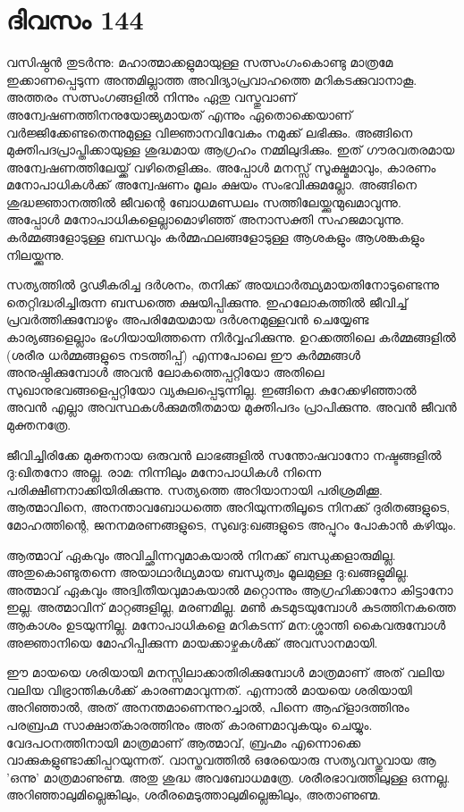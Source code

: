  
\section{ദിവസം 144}


വസിഷ്ഠൻ തുടർന്നു: മഹാത്മാക്കളുമായുള്ള സത്സംഗംകൊണ്ടു മാത്രമേ ഇക്കാണപ്പെടുന്ന അന്തമില്ലാത്ത അവിദ്യാപ്രവാഹത്തെ  മറികടക്കുവാനാകൂ. അത്തരം സത്സംഗങ്ങളിൽ നിന്നും ഏതു വസ്തുവാണ്‌ അന്വേഷണത്തിനനുയോജ്യമായത് എന്നും ഏതൊക്കെയാണ്‌ വർജ്ജിക്കേണ്ടതെന്നുമുള്ള വിജ്ഞാനവിവേകം നമുക്ക് ലഭിക്കും. അങ്ങിനെ മുക്തിപദപ്രാപ്തിക്കായുള്ള ശുദ്ധമായ ആഗ്രഹം നമ്മിലുദിക്കും. ഇത് ഗൗരവതരമായ അന്വേഷണത്തിലേയ്ക്ക് വഴിതെളിക്കും. അപ്പോൾ മനസ്സ് സൂക്ഷ്മമാവും, കാരണം മനോപാധികൾക്ക് അന്വേഷണം മൂലം ക്ഷയം സംഭവിക്കുമല്ലോ. അങ്ങിനെ ശുദ്ധജ്ഞാനത്തിൽ ജീവന്റെ ബോധമണ്ഡലം സത്തിലേയ്ക്കുന്മുഖമാവുന്നു. അപ്പോൾ മനോപാധികളെല്ലാമൊഴിഞ്ഞ് അനാസക്തി സഹജമാവുന്നു. കർമ്മങ്ങളോടുള്ള ബന്ധവും കർമ്മഫലങ്ങളോടുള്ള ആശകളും ആശങ്കകളും നിലയ്ക്കുന്നു.

സത്യത്തിൽ ദൃഢീകരിച്ച ദർശനം, തനിക്ക് അയഥാർത്ഥ്യമായതിനോടുണ്ടെന്നു തെറ്റിദ്ധരിച്ചിരുന്ന ബന്ധത്തെ ക്ഷയിപ്പിക്കുന്നു. ഇഹലോകത്തിൽ ജീവിച്ച് പ്രവർത്തിക്കുമ്പോഴും അപരിമേയമായ ദർശനമുള്ളവൻ ചെയ്യേണ്ട കാര്യങ്ങളെല്ലാം ഭംഗിയായിത്തന്നെ നിർവ്വഹിക്കുന്നു. ഉറക്കത്തിലെ കർമ്മങ്ങളിൽ (ശരീര ധർമ്മങ്ങളുടെ നടത്തിപ്പ്) എന്നപോലെ ഈ കർമ്മങ്ങൾ അനുഷ്ഠിക്കുമ്പോൾ അവൻ ലോകത്തെപ്പറ്റിയോ അതിലെ സുഖാനുഭവങ്ങളെപ്പറ്റിയോ വ്യകുലപ്പെടുന്നില്ല. ഇങ്ങിനെ കുറേക്കഴിഞ്ഞാൽ അവൻ എല്ലാ അവസ്ഥകൾക്കുമതീതമായ മുക്തിപദം പ്രാപിക്കുന്നു. അവൻ ജീവൻ മുക്തനത്രേ.

ജീവിച്ചിരിക്കേ മുക്തനായ ഒരുവൻ ലാഭങ്ങളിൽ സന്തോഷവാനോ നഷ്ടങ്ങളിൽ ദു:ഖിതനോ അല്ല. രാമ: നിന്നിലും മനോപാധികൾ നിന്നെ പരിക്ഷീണനാക്കിയിരിക്കുന്നു. സത്യത്തെ അറിയാനായി പരിശ്രമിക്കൂ. ആത്മാവിനെ, അനന്താവബോധത്തെ അറിയുന്നതിലൂടെ നിനക്ക് ദുരിതങ്ങളുടെ, മോഹത്തിന്റെ, ജനനമരണങ്ങളുടെ, സുഖദു:ഖങ്ങളുടെ അപ്പുറം പോകാൻ കഴിയും.

ആത്മാവ് ഏകവും അവിച്ഛിന്നവുമാകയാൽ നിനക്ക് ബന്ധുക്കളാരുമില്ല. അതുകൊണ്ടുതന്നെ അയാഥാർഥ്യമായ ബന്ധുത്വം മൂലമുള്ള ദു:ഖങ്ങളുമില്ല. അത്മാവ് ഏകവും അദ്വിതീയവുമാകയാൽ മറ്റൊന്നും ആഗ്രഹിക്കാനോ കിട്ടാനോ ഇല്ല. അത്മാവിന്‌ മാറ്റങ്ങളില്ല, മരണമില്ല. മൺ കുടമുടയുമ്പോൾ കുടത്തിനകത്തെ ആകാശം ഉടയുന്നില്ല. മനോപാധികളെ മറികടന്ന്‌ മന:ശ്ശാന്തി കൈവരുമ്പോൾ അജ്ഞാനിയെ മോഹിപ്പിക്കുന്ന മായക്കാഴ്ചകൾക്ക് അവസാനമായി.

ഈ മായയെ ശരിയായി മനസ്സിലാക്കാതിരിക്കുമ്പോൾ മാത്രമാണ്‌ അത് വലിയ വലിയ വിഭ്രാന്തികൾക്ക് കാരണമാവുന്നത്. എന്നാൽ മായയെ ശരിയായി അറിഞ്ഞാൽ, അത് അനന്തമാണെന്നുറച്ചാൽ, പിന്നെ ആഹ്ളാദത്തിനും പരബ്രഹ്മ സാക്ഷാത്കാരത്തിനും അത് കാരണമാവുകയും ചെയ്യും. വേദപഠനത്തിനായി മാത്രമാണ്‌ ആത്മാവ്, ബ്രഹ്മം എന്നൊക്കെ വാക്കുകളുണ്ടാക്കിപ്പറയുന്നത്. വാസ്തവത്തിൽ ഒരേയൊരു സത്യവസ്തുവായ ആ 'ഒന്നു' മാത്രമാണുണ്മ. അതു ശുദ്ധ അവബോധമത്രേ. ശരീരഭാവത്തിലുള്ള ഒന്നല്ല. അറിഞ്ഞാലുമില്ലെങ്കിലും, ശരീരമെടുത്താലുമില്ലെങ്കിലും, അതാണുണ്മ.

